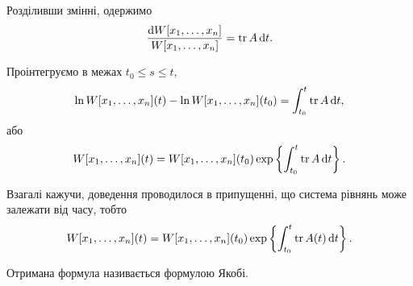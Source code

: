 Розділивши змінні, одержимо
\begin{equation*}
	\frac{\mathop{}\!\mathrm{d} W[x_1, \ldots, x_n]}{W[x_1, \ldots, x_n]}  = \operatorname{tr} A \mathop{}\!\mathrm{d} t.
\end{equation*}

Проінтегруємо в межах $t_0 \le s \le t$,
\begin{equation*}
	\ln W[x_1, \ldots, x_n](t) - \ln W[x_1, \ldots, x_n](t_0) = \int_{t_0}^t \operatorname{tr} A \mathop{}\!\mathrm{d} t,
\end{equation*}
або 
\begin{equation*}
	W[x_1, \ldots, x_n](t) = W[x_1, \ldots, x_n](t_0) \exp\left\{\int_{t_0}^t \operatorname{tr} A \mathop{}\!\mathrm{d} t\right\}.
\end{equation*}

Взагалі кажучи, доведення проводилося в припущенні, що система рівнянь може залежати від часу, тобто
\begin{equation*}
	W[x_1, \ldots, x_n](t) = W[x_1, \ldots, x_n](t_0) \exp\left\{\int_{t_0}^t \operatorname{tr} A(t) \mathop{}\!\mathrm{d} t\right\}.
\end{equation*}

Отримана формула називається формулою Якобі.
